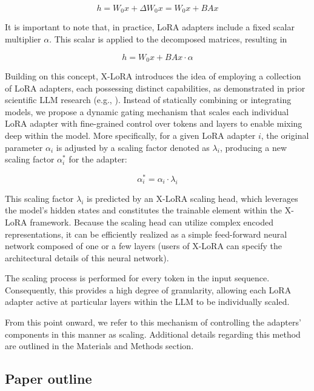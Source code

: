 \begin{equation}
    h = W_0x + \Delta W_0x = W_0x + BAx
\end{equation}

It is important to note that, in practice, LoRA adapters include a fixed scalar multiplier $\alpha$. This scalar is applied to the decomposed matrices, resulting in

\begin{equation}
    h = W_0x + BAx \cdot \alpha
\end{equation}

Building on this concept, X-LoRA introduces the idea of employing a collection of LoRA adapters, each possessing distinct capabilities, as demonstrated in prior scientific LLM research (e.g., \cite{Buehler2023GenerativeDesign}). Instead of statically combining or integrating models, we propose a dynamic gating mechanism that scales each individual LoRA adapter with fine-grained control over tokens and layers to enable mixing deep within the model. More specifically, for a given LoRA adapter $i$, the original parameter $\alpha_i$ is adjusted by a scaling factor denoted as $\lambda_i$, producing a new scaling factor $\alpha^*_i$ for the adapter:

\begin{equation}
    \alpha^*_i = \alpha_i \cdot \lambda_i
\end{equation}

This scaling factor $\lambda_i$ is predicted by an X-LoRA scaling head, which leverages the model’s hidden states and constitutes the trainable element within the X-LoRA framework. Because the scaling head can utilize complex encoded representations, it can be efficiently realized as a simple feed-forward neural network composed of one or a few layers (users of X-LoRA can specify the architectural details of this neural network).

The scaling process is performed for every token in the input sequence. Consequently, this provides a high degree of granularity, allowing each LoRA adapter active at particular layers within the LLM to be individually scaled.

From this point onward, we refer to this mechanism of controlling the adapters’ components in this manner as scaling. Additional details regarding this method are outlined in the Materials and Methods section.

\subsection{Paper outline}


